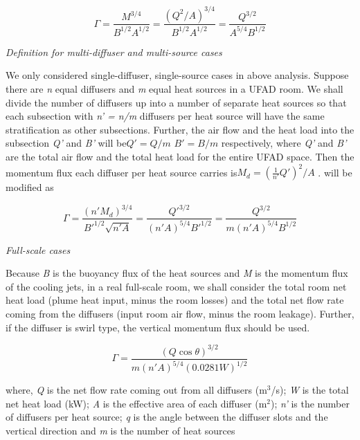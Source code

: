 \begin{equation}
\Gamma  = \frac{{{M^{3/4}}}}{{{B^{1/2}}{A^{1/2}}}} = \frac{{{{({Q^2}/A)}^{3/4}}}}{{{B^{1/2}}{A^{1/2}}}} = \frac{{{Q^{3/2}}}}{{{A^{5/4}}{B^{1/2}}}}
\end{equation}

\emph{Definition for multi-diffuser and multi-source cases}

We only considered single-diffuser, single-source cases in above analysis. Suppose there are \emph{n} equal diffusers and \emph{m} equal heat sources in a UFAD room. We shall divide the number of diffusers up into a number of separate heat sources so that each subsection with \emph{n' = n/m} diffusers per heat source will have the same stratification as other subsections. Further, the air flow and the heat load into the subsection \emph{Q'} and \emph{B'} will be\(Q' = Q/m\) \(B' = B/m\) respectively, where \emph{Q'} and \emph{B'} are the total air flow and the total heat load for the entire UFAD space. Then the momentum flux each diffuser per heat source carries is\({M_d} = {(\frac{1}{{n'}}Q')^2}/A\) . will be modified as

\begin{equation}
\Gamma  = \frac{{{{(n'{M_d})}^{3/4}}}}{{B{'^{1/2}}\sqrt {n'A} }} = \frac{{Q{'^{3/2}}}}{{{{(n'A)}^{5/4}}B{'^{1/2}}}} = \frac{{{Q^{3/2}}}}{{m{{(n'A)}^{5/4}}{B^{1/2}}}}
\end{equation}

\emph{Full-scale cases}

Because \emph{B} is the buoyancy flux of the heat sources and \emph{M} is the momentum flux of the cooling jets, in a real full-scale room, we shall consider the total room net heat load (plume heat input, minus the room losses) and the total net flow rate coming from the diffusers (input room air flow, minus the room leakage). Further, if the diffuser is swirl type, the vertical momentum flux should be used.

\begin{equation}
\Gamma  = \frac{{{{(Q\cos \theta )}^{3/2}}}}{{m{{(n'A)}^{5/4}}{{(0.0281W)}^{1/2}}}}
\end{equation}

where, \emph{Q} is the net flow rate coming out from all diffusers (m\(^{3}\)/s); \emph{W} is the total net heat load (kW); \emph{A} is the effective area of each diffuser (m\(^{2}\)); \emph{n'} is the number of diffusers per heat source; \emph{q} is the angle between the diffuser slots and the vertical direction and \emph{m} is the number of heat sources

